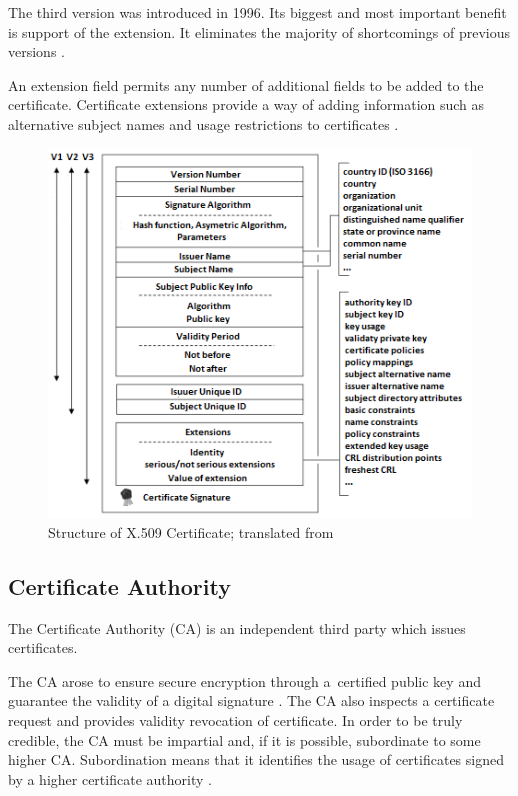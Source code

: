 \documentclass[
  12pt, 
  digital, %
  notable,   %
  nolof,     %
  nolot,     %
]{fithesis3}
\begin{document}
The third version was introduced in 1996. Its biggest and most important benefit is support of
the extension. It eliminates the majority of shortcomings of previous versions 
\cite{housley2002internet}. 

An extension field permits any number of additional fields to be added to the certificate. 
Certificate extensions provide a way of adding information such as alternative subject names and 
usage restrictions to certificates \cite{b.3}.

\begin{figure}[th]
	\centering
	\includegraphics[width=1\textwidth]{certificate}
	\caption{Structure of X.509 Certificate; translated from \cite{ostadal_2010}}
	\label{fig:certificate}
\end{figure}

\subsection{Certificate Authority}
The Certificate Authority (CA) is an independent third party which issues certificates.

The CA arose to ensure secure encryption through a~certified public key and guarantee the validity 
of a digital signature \cite{singh2003kniha}. The CA also inspects a certificate request and 
provides validity revocation of certificate. In order to be truly credible, the CA must be 
impartial and, if it is possible, subordinate to some higher CA. Subordination means that it 
identifies the usage of certificates signed by a higher certificate authority 
\cite{dostalek2016velky}.
\end{document}

